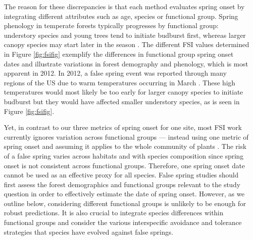 \documentclass{article}\usepackage[]{graphicx}\usepackage[]{color}
\begin{document}
The reason for these discrepancies is that each method evaluates spring onset by integrating different attributes such as age, species or functional group. Spring phenology in temperate forests typically progresses by functional group: understory species and young trees tend to initiate budburst first, whereas larger canopy species may start later in the season \citep{Richardson2009, Xin2016}. The different FSI values determined in Figure \ref{fig:fsifig} exemplify the differences in functional group spring onset dates and illustrate variations in forest demography and phenology, which is most apparent in 2012. In 2012, a false spring event was reported through many regions of the US due to warm temperatures occurring in March \citep{Ault2015}. These high temperatures would most likely be too early for larger canopy species to initiate budburst but they would have affected smaller understory species, as is seen in Figure \ref{fig:fsifig}. 

Yet, in contrast to our three metrics of spring onset for one site, most FSI work currently ignores variation across functional groups --- instead using one metric of spring onset and assuming it applies to the whole community of plants \citep{Marino2011, Peterson2014, Allstadt2015, Mehdipoor2017}. The risk of a false spring varies across habitats and with species composition since spring onset is not consistent across functional groups. Therefore, one spring onset date cannot be used as an effective proxy for all species. False spring studies should first assess the forest demographics and functional groups relevant to the study question in order to effectively estimate the date of spring onset. However, as we outline below, considering different functional groups is unlikely to be enough for robust predictions. It is also crucial to integrate species differences within functional groups and consider the various interspecific avoidance and tolerance strategies that species have evolved against false springs. 
\end{document}
